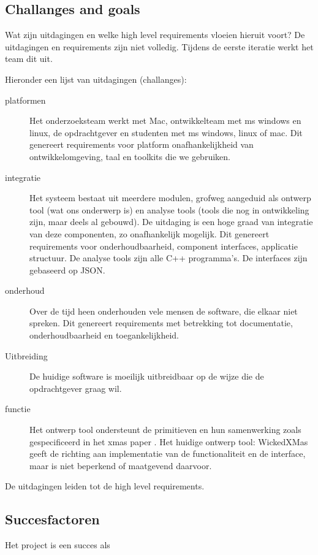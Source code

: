 \subsection{Challanges and goals}\label{sec: challanges goals}

Wat zijn uitdagingen en welke high level requirements vloeien hieruit voort? De uitdagingen en requirements
zijn niet volledig. Tijdens de eerste iteratie werkt het team dit uit.

Hieronder een lijst van uitdagingen (challanges):

\begin{description}
 \item[platformen] Het onderzoeksteam werkt met Mac, ontwikkelteam met ms windows en linux, de opdrachtgever en studenten met ms windows, linux of mac.
		    Dit genereert requirements voor platform onafhankelijkheid van ontwikkelomgeving, taal en toolkits die we gebruiken.
 \item[integratie] Het systeem bestaat uit meerdere modulen, grofweg aangeduid als ontwerp tool (wat ons onderwerp is) en analyse tools (tools die nog
		    in ontwikkeling zijn, maar deels al gebouwd). De uitdaging is een hoge graad van integratie van deze componenten, zo onafhankelijk mogelijk.
		    Dit genereert requirements voor onderhoudbaarheid, component interfaces, applicatie structuur. De analyse tools zijn alle C++ programma's.
		    De interfaces zijn gebaseerd op JSON.
 \item[onderhoud] Over de tijd heen onderhouden vele mensen de software, die elkaar niet spreken. Dit genereert requirements met betrekking tot documentatie,
		    onderhoudbaarheid en toegankelijkheid.
 \item[Uitbreiding] De huidige software is moeilijk uitbreidbaar op de wijze die de opdrachtgever graag wil.
 \item[functie] Het ontwerp tool ondersteunt de primitieven en hun samenwerking zoals gespecificeerd in het xmas paper \cite{chatterjee-kishinevsky:xmas}.
		Het  huidige ontwerp tool: WickedXMas geeft de richting aan implementatie van de functionaliteit en de interface, maar is
		niet beperkend of maatgevend daarvoor.
\end{description}

De uitdagingen leiden tot de high level requirements.

\subsection{Succesfactoren}
Het project is een succes als

